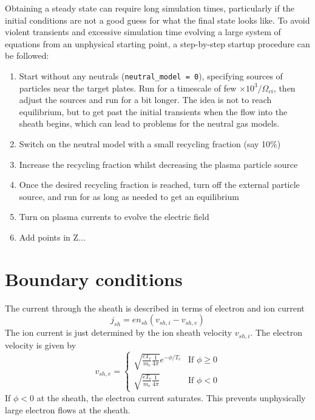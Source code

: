 \documentclass[12pt,a4paper]{article}
\begin{document}
Obtaining a steady state can require long simulation times, particularly if the initial conditions are not a good
guess for what the final state looks like. To avoid violent transients and excessive simulation time evolving
a large system of equations from an unphysical starting point, a step-by-step startup procedure can be followed:
\begin{enumerate}
\item Start without any neutrals (\texttt{neutral\_model = 0}), specifying sources of particles near the target plates.
  Run for a timescale of few $\times 10^3 / \Omega_{ci}$, then adjust the sources and run for a bit longer. The idea
  is not to reach equilibrium, but to get past the initial transients when the flow into the sheath begins, which can
  lead to problems for the neutral gas models.
\item Switch on the neutral model with a small recycling fraction (say 10\%)
\item Increase the recycling fraction whilst decreasing the plasma particle source
\item Once the desired recycling fraction is reached, turn off the external particle source,
  and run for as long as needed to get an equilibrium
\item Turn on plasma currents to evolve the electric field
\item Add points in Z...
\end{enumerate}

\section{Boundary conditions}
\label{sec:boundary}

The current through the sheath is described in terms of electron and ion current
\[
j_{sh} = en_{sh}\left(v_{sh,i} - v_{sh,e}\right)
\]
The ion current is just determined by the ion sheath velocity $v_{sh,i}$.
The electron velocity is given by
\begin{equation}
v_{sh,e} = \left\{\begin{array}{ll}
  \sqrt{\frac{eT_e}{m_e}\frac{1}{4\pi}}e^{-\phi/T_e} & \textrm{If $\phi \ge 0$} \\
  \sqrt{\frac{eT_e}{m_e}\frac{1}{4\pi}} & \textrm{If $\phi < 0$}
\end{array}\right.
\end{equation}
If $\phi < 0$ at the sheath, the electron current saturates. This
prevents unphysically large electron flows at the sheath.
\end{document}
